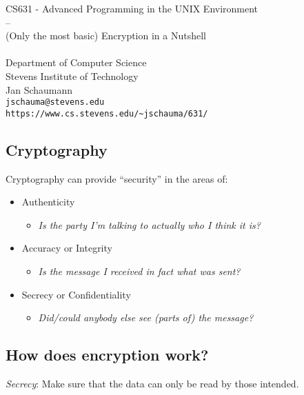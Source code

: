\documentclass[xga]{xdvislides}
\begin{document}
\setfontphv

\lhead{\slidetitle}
\cfoot{\relax}
\rfoot{\Gray{\today}}

\vspace*{\fill}
\begin{center}
	\Hugesize
		CS631 - Advanced Programming in the UNIX Environment\\
		-- \\
		(Only the most basic) Encryption in a Nutshell \\
	\hspace*{5mm}\blueline\\ [1em]
	\Normalsize
		Department of Computer Science\\
		Stevens Institute of Technology\\
		Jan Schaumann\\
		\verb+jschauma@stevens.edu+\\
		\verb+https://www.cs.stevens.edu/~jschauma/631/+
\end{center}
\vspace*{\fill}

\subsection{Cryptography}
Cryptography can provide ``security'' in the areas of:
\begin{itemize}
	\item Authenticity
		\begin{itemize}
			\item {\em Is the party I'm talking to actually who I {\em think} it is?}
		\end{itemize}
	\item Accuracy or Integrity
		\begin{itemize}
			\item {\em Is the message I received in fact what was sent?}
		\end{itemize}
	\item Secrecy or Confidentiality
		\begin{itemize}
			\item {\em Did/could anybody else see (parts of) the message?}
		\end{itemize}
\end{itemize}


\subsection{How does encryption work?}
{\em Secrecy}:  Make sure that the data can only be read by those intended.
\end{document}

